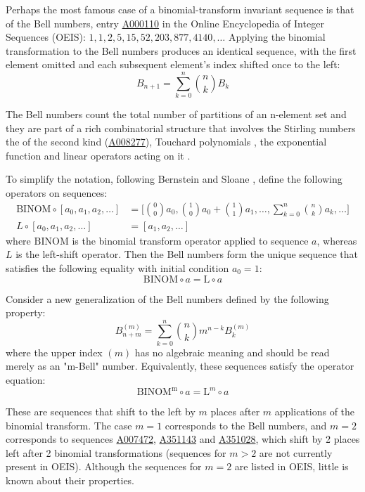 \documentclass[a4paper]{amsart}
\begin{document}
Perhaps the most famous case of a binomial-transform invariant sequence is that of the Bell numbers, entry \href{https://oeis.org/A000110}{A000110} in the Online Encyclopedia of Integer Sequences (OEIS): $1, 1, 2, 5, 15, 52, 203, 877, 4140, \ldots$ Applying the binomial transformation to the Bell numbers produces an identical sequence, with the first element omitted and each subsequent element's index shifted once to the left:
\begin{equation}\label{eq-bell-recurrence}
B_{n+1} = \sum_{k=0}^{n} \binom{n}{k} B_k
\end{equation}

The Bell numbers count the total number of partitions of an n-element set and they are part of a rich combinatorial structure that involves the Stirling numbers the of the second kind (\href{https://oeis.org/A008277}{A008277}), Touchard polynomials \cite{weisstein}, the exponential function and linear operators acting on it \cite{dattoliTouchardPolynomialsGeneralized2010}.

To simplify the notation, following Bernstein and Sloane \cite{bernstein1995}, define the following operators on sequences:
\[
\begin{aligned}
\mathrm{BINOM} \circ [a_0,a_1,a_2, \dots] &= \bigg[\binom{0}{0}a_0,\binom{1}{0}a_0+\binom{1}{1}a_1, \ldots, \sum_{k=0}^n\binom{n}{k}a_k, \ldots \bigg] \\
L \circ [a_0,a_1,a_2, \ldots] &= [a_1,a_2, \ldots]
\end{aligned}
\]
where $\mathrm{BINOM}$ is the binomial transform operator applied to sequence $a$, whereas $L$ is the left-shift operator. Then the Bell numbers form the unique sequence that satisfies the following equality with initial condition $a_0 = 1:$
\[
\mathrm{BINOM} \circ a = \mathrm{L} \circ a
\]

Consider a new generalization of the Bell numbers defined by the following property:
\begin{equation}\label{eq-mbell-recurrence}
B^{(m)}_{n+m} = \sum_{k=0}^n \binom{n}{k} m^{n-k} B_k^{(m)}
\end{equation}
where the upper index $(m)$ has no algebraic meaning and should be read merely as an "m-Bell" number. Equivalently, these sequences satisfy the operator equation:
\begin{equation}\label{eq-mbell-operator}
\mathrm{BINOM^m} \circ a = \mathrm{L}^m \circ a
\end{equation}

These are sequences that shift to the left by $m$ places after $m$ applications of the binomial transform. The case $m=1$ corresponds to the Bell numbers, and $m=2$ corresponds to sequences \href{https://oeis.org/A007472}{A007472}, \href{https://oeis.org/search?q=1,0,1,2,5,16&language=english&go=Search}{A351143} and \href{https://oeis.org/A351028}{A351028}, which shift by 2 places left after 2 binomial transformations (sequences for $m>2$ are not currently present in OEIS). Although the sequences for $m=2$ are listed in OEIS, little is known about their properties.
\end{document}
